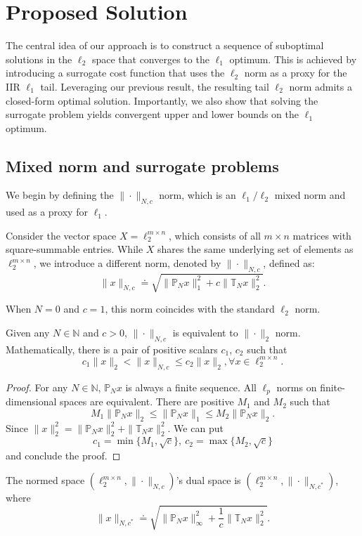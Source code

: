 \section{Proposed Solution}
The central idea of our approach is to construct a sequence of suboptimal solutions in the \(\ell_2\) space that converges to the \(\ell_1\) optimum. This is achieved by introducing a surrogate cost function that uses the \(\ell_2\) norm as a proxy for the IIR \(\ell_1\) tail. Leveraging our previous result, the resulting tail \(\ell_2\) norm admits a closed-form optimal solution. Importantly, we also show that solving the surrogate problem yields convergent upper and lower bounds on the \(\ell_1\) optimum.

\subsection{Mixed norm and surrogate problems}
We begin by defining the $\|\cdot\|_{N,c}$ norm, which is an \(\ell_1/\ell_2\) mixed norm and used as a proxy for \(\ell_1\).

\begin{defn}
Consider the vector space \( X = \ell_2^{m \times n} \), which consists of all \( m \times n \) matrices with square-summable entries. While \( X \) shares the same underlying set of elements as \( \ell_2^{m \times n} \), we introduce a different norm, denoted by \( \|\cdot\|_{N,c} \), defined as:
\[
\|x\|_{N,c} \doteq \sqrt{\|\mathbb{P}_N x\|_1^2 + c \|\mathbb{T}_N x\|_2^2}.
\]
\end{defn}
When \(N=0\) and \(c=1\), this norm coincides with the standard \(\ell_2\) norm.
\begin{prop}\label{prop:normeq}
Given any \(N\in \mathbb{N}\) and \(c>0\), \(\|\cdot\|_{N,c}\) is equivalent to \(\|\cdot\|_2\) norm. Mathematically, there is a pair of positive scalars \(c_1\), \(c_2\) such that
\[
c_1\|x\|_{2} < \|x\|_{N,c} \leq c_2 \|x\|_{2}, \forall x\in \ell_2^{m\times n}.
\]
\end{prop}
\begin{proof}
For any \(N\in \mathbb{N}\), \(\mathbb{P}_N x\) is always a finite sequence. All \(\ell_p\) norms on finite-dimensional spaces are equivalent. There are positive \(M_1\) and \(M_2\) such that
\[
M_1 \|\mathbb{P}_N x\|_2\leq\|\mathbb{P}_N x\|_1 \leq M_2 \|\mathbb{P}_N x\|_2.
\]
Since \(\|x\|_{2}^2 = \|\mathbb{P}_N x\|_2^2 + \|\mathbb{T}_N x\|_2^2\).
We can put
\[
c_1 = \min\{M_1,\sqrt{c}\},\ c_2 = \max\{M_2,\sqrt{c}\}
\] and conclude the proof.
\end{proof}
\begin{prop}
The normed space \((\ell_2^{m\times n}, \|\cdot\|_{N,c})\)'s dual space is \((\ell_2^{m\times n},\|\cdot\|_{{N,c}^*})\), where
\[
\|x\|_{{N,c}^*} \doteq \sqrt{\|\mathbb{P}_N x\|_\infty^2 + \frac{1}{c} \|\mathbb{T}_N x\|_2^2}.
\]
\end{prop}

